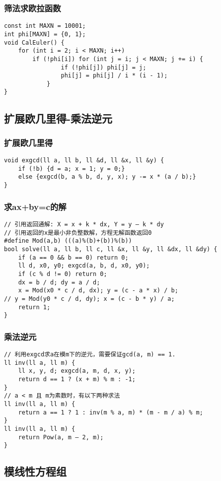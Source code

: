 \documentclass[a4]{article}
\begin{document}
\subsubsection{筛法求欧拉函数}
\begin{lstlisting}
const int MAXN = 10001;
int phi[MAXN] = {0, 1};
void CalEuler() {
	for (int i = 2; i < MAXN; i++)
		if (!phi[i]) for (int j = i; j < MAXN; j += i) {
				if (!phi[j]) phi[j] = j;
				phi[j] = phi[j] / i * (i - 1);
			}
}
\end{lstlisting}
\subsection{扩展欧几里得-乘法逆元}
\subsubsection{扩展欧几里得}
\begin{lstlisting}
void exgcd(ll a, ll b, ll &d, ll &x, ll &y) {
	if (!b) {d = a; x = 1; y = 0;}
	else {exgcd(b, a % b, d, y, x); y -= x * (a / b);}
}
\end{lstlisting}
\subsubsection{求ax+by=c的解}
\begin{lstlisting}
// 引用返回通解: X = x + k * dx, Y = y – k * dy
// 引用返回的x是最小非负整数解，方程无解函数返回0
#define Mod(a,b) (((a)%(b)+(b))%(b))
bool solve(ll a, ll b, ll c, ll &x, ll &y, ll &dx, ll &dy) {
	if (a == 0 && b == 0) return 0;
	ll d, x0, y0; exgcd(a, b, d, x0, y0);
	if (c % d != 0) return 0;
	dx = b / d; dy = a / d;
	x = Mod(x0 * c / d, dx); y = (c - a * x) / b; 
// y = Mod(y0 * c / d, dy); x = (c - b * y) / a;
	return 1;
}
\end{lstlisting}
\subsubsection{乘法逆元}
\begin{lstlisting}
// 利用exgcd求a在模m下的逆元，需要保证gcd(a, m) == 1.
ll inv(ll a, ll m) {
	ll x, y, d; exgcd(a, m, d, x, y);
	return d == 1 ? (x + m) % m : -1;
}
// a < m 且 m为素数时，有以下两种求法
ll inv(ll a, ll m) {
	return a == 1 ? 1 : inv(m % a, m) * (m - m / a) % m;
} 
ll inv(ll a, ll m) {
	return Pow(a, m – 2, m);
}
\end{lstlisting}
\subsection{模线性方程组}
\end{document}
